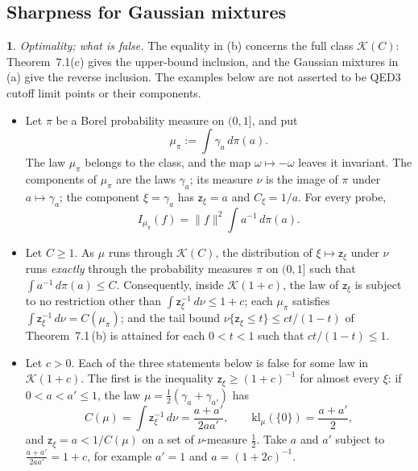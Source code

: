 \documentclass[11pt]{amsart}
\newcommand{\namedhead}{}
\theoremstyle{definition}
\newtheorem*{namedinner}{\namedhead}
\newenvironment{named}[1]{\renewcommand{\namedhead}{#1}\begin{namedinner}}{\end{namedinner}}
\begin{document}
\subsection{Sharpness for Gaussian mixtures}
\begin{named}{Proposition 7.2}
\emph{Optimality; what is false.}
The equality in (b) concerns the full class $\mathcal K(C)$:
Theorem~7.1(c) gives the upper-bound inclusion, and the Gaussian mixtures
in (a) give the reverse inclusion. The examples below are not asserted
to be QED3 cutoff limit points or their components.
\begin{itemize}
\item[(a)] Let $\pi$ be a Borel probability measure on $(0,1]$, and put
\begin{equation*}
\mu_\pi:=\int\gamma_a\,d\pi(a).
\end{equation*}
The law $\mu_\pi$ belongs to the class, and the map $\omega\mapsto-\omega$ leaves it invariant.
The components of $\mu_\pi$ are the laws $\gamma_a$;
its measure $\nu$ is the image of $\pi$ under $a\mapsto\gamma_a$;
the component $\xi=\gamma_a$ has $\mathsf z_\xi=a$ and $C_\xi=1/a$.
For every probe,
\begin{equation*}
I_{\mu_\pi}(f)=\|f\|^2\int a^{-1}\,d\pi(a).
\end{equation*}
\item[(b)] Let $C\ge1$.
As $\mu$ runs through $\mathcal K(C)$, the distribution of $\xi\mapsto\mathsf z_\xi$ under $\nu$ runs \emph{exactly} through the probability measures $\pi$ on $(0,1]$ such that $\int a^{-1}\,d\pi(a)\le C$.
Consequently, inside $\mathcal K(1+c)$, the law of $\mathsf z_\xi$ is subject to no restriction other than $\int\mathsf z_\xi^{-1}\,d\nu\le1+c$;
each $\mu_\pi$ satisfies $\int\mathsf z_\xi^{-1}\,d\nu=C(\mu_\pi)$;
and the tail bound $\nu\{\mathsf z_\xi\le t\}\le ct/(1-t)$ of Theorem~7.1\,(b) is attained for each $0<t<1$ such that $ct/(1-t)\le1$.
\item[(c)] Let $c>0$.
Each of the three statements below is false for some law in $\mathcal K(1+c)$.
The first is the inequality $\mathsf z_\xi\ge(1+c)^{-1}$ for almost every $\xi$:
if $0<a<a'\le1$, the law $\mu=\frac12(\gamma_a+\gamma_{a'})$ has
\begin{equation*}
C(\mu)=\int\mathsf z_\xi^{-1}\,d\nu=\frac{a+a'}{2aa'},\qquad\mathrm{kl}_\mu(\{0\})=\frac{a+a'}2,
\end{equation*}
and $\mathsf z_\xi=a<1/C(\mu)$ on a set of $\nu$-measure $\frac12$.
Take $a$ and $a'$ subject to $\frac{a+a'}{2aa'}=1+c$, for example $a'=1$ and $a=(1+2c)^{-1}$.

\end{itemize}
\end{named}
\end{document}
